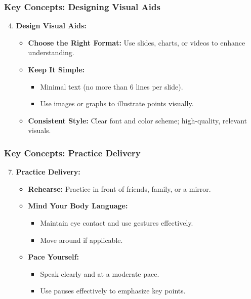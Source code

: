 \documentclass[aspectratio=169]{beamer}
\begin{document}
\begin{frame}[fragile]
    \frametitle{Key Concepts: Designing Visual Aids}
    
    \begin{enumerate}
        \setcounter{enumi}{3}
        \item \textbf{Design Visual Aids:} 
        \begin{itemize}
            \item \textbf{Choose the Right Format:} Use slides, charts, or videos to enhance understanding.
            \item \textbf{Keep It Simple:} 
            \begin{itemize}
                \item Minimal text (no more than 6 lines per slide).
                \item Use images or graphs to illustrate points visually.
            \end{itemize}
            \item \textbf{Consistent Style:} Clear font and color scheme; high-quality, relevant visuals.
        \end{itemize}
    \end{enumerate}
\end{frame}

\begin{frame}[fragile]
    \frametitle{Key Concepts: Practice Delivery}
    
    \begin{enumerate}
        \setcounter{enumi}{6}
        \item \textbf{Practice Delivery:}
        \begin{itemize}
            \item \textbf{Rehearse:} Practice in front of friends, family, or a mirror.
            \item \textbf{Mind Your Body Language:} 
            \begin{itemize}
                \item Maintain eye contact and use gestures effectively.
                \item Move around if applicable.
            \end{itemize}
            \item \textbf{Pace Yourself:} 
            \begin{itemize}
                \item Speak clearly and at a moderate pace.
                \item Use pauses effectively to emphasize key points.
            \end{itemize}
        \end{itemize}
    \end{enumerate}
\end{frame}
\end{document}
